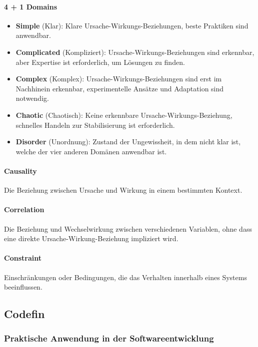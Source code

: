 \paragraph{4 + 1 Domains}

\begin{itemize}
    \item \textbf{Simple} (Klar): Klare Ursache-Wirkungs-Beziehungen, beste Praktiken sind anwendbar.
    \item \textbf{Complicated} (Kompliziert): Ursache-Wirkungs-Beziehungen sind erkennbar, aber Expertise ist erforderlich, um Lösungen zu finden.
    \item \textbf{Complex} (Komplex): Ursache-Wirkungs-Beziehungen sind erst im Nachhinein erkennbar, experimentelle Ansätze und Adaptation sind notwendig.
    \item \textbf{Chaotic} (Chaotisch): Keine erkennbare Ursache-Wirkungs-Beziehung, schnelles Handeln zur Stabilisierung ist erforderlich.
    \item \textbf{Disorder} (Unordnung): Zustand der Ungewissheit, in dem nicht klar ist, welche der vier anderen Domänen anwendbar ist.
\end{itemize}

\paragraph{Causality} Die Beziehung zwischen Ursache und Wirkung in einem bestimmten Kontext.

\paragraph{Correlation} Die Beziehung und Wechselwirkung zwischen verschiedenen Variablen, ohne dass eine direkte Ursache-Wirkung-Beziehung impliziert wird.

\paragraph{Constraint} Einschränkungen oder Bedingungen, die das Verhalten innerhalb eines Systems beeinflussen.

\subsection{Codefin}

\subsubsection{Praktische Anwendung in der Softwareentwicklung}

